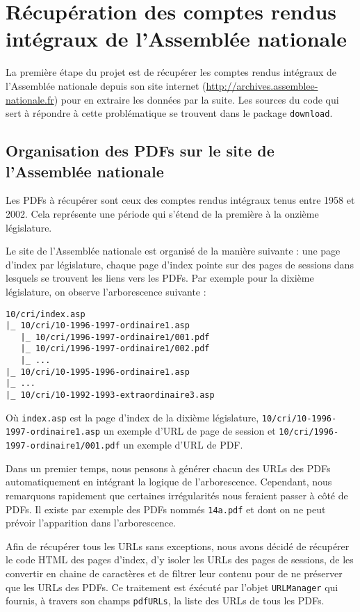 \section[Récupération des comptes rendus intégraux]{Récupération des comptes rendus intégraux de l'Assemblée nationale}

La première étape du projet est de récupérer les comptes rendus intégraux de l'Assemblée nationale depuis son site internet (\url{http://archives.assemblee-nationale.fr}) pour en extraire les données par la suite. Les sources du code qui sert à répondre à cette problématique se trouvent dans le package \verb|download|.

\subsection{Organisation des PDFs sur le site de l'Assemblée nationale}

Les PDFs à récupérer sont ceux des comptes rendus intégraux tenus entre 1958 et 2002. Cela représente une période qui s'étend de la première à la onzième législature.

Le site de l'Assemblée nationale est organisé de la manière suivante : une page d'index par législature, chaque page d'index pointe sur des pages de sessions dans lesquels se trouvent les liens vers les PDFs. Par exemple pour la dixième législature, on observe l'arborescence suivante :
\begin{verbatim}
10/cri/index.asp
|_ 10/cri/10-1996-1997-ordinaire1.asp
   |_ 10/cri/1996-1997-ordinaire1/001.pdf
   |_ 10/cri/1996-1997-ordinaire1/002.pdf
   |_ ...
|_ 10/cri/10-1995-1996-ordinaire1.asp
|_ ...
|_ 10/cri/10-1992-1993-extraordinaire3.asp
\end{verbatim}
Où \verb|index.asp| est la page d'index de la dixième législature, \verb|10/cri/10-1996-1997-ordinaire1.asp| un exemple d'URL de page de session et \verb|10/cri/1996-1997-ordinaire1/001.pdf| un exemple d'URL de PDF.

Dans un premier temps, nous pensons à générer chacun des URLs des PDFs automatiquement en intégrant la logique de l'arborescence. Cependant, nous remarquons rapidement que certaines irrégularités nous feraient passer à côté de PDFs. Il existe par exemple des PDFs nommés \verb|14a.pdf| et dont on ne peut prévoir l'apparition dans l'arborescence.

Afin de récupérer tous les URLs sans exceptions, nous avons décidé de récupérer le code HTML des pages d'index, d'y isoler les URLs des pages de sessions, de les convertir en chaine de caractères et de filtrer leur contenu pour de ne préserver que les URLs des PDFs. Ce traitement est éxécuté par l'objet \verb|URLManager| qui fournis, à travers son champs \verb|pdfURLs|, la liste des URLs de tous les PDFs.

